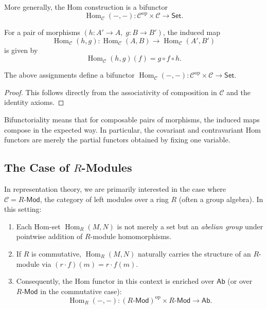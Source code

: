 More generally, the Hom construction is a bifunctor
\[
\operatorname{Hom}_{\mathcal{C}}(-, -): \mathcal{C}^{\mathrm{op}} \times \mathcal{C} \longrightarrow \mathsf{Set}.
\]

For a pair of morphisms $(h: A' \to A, \; g: B \to B')$, the induced map
\[
\operatorname{Hom}_{\mathcal{C}}(h, g): \operatorname{Hom}_{\mathcal{C}}(A, B) \longrightarrow \operatorname{Hom}_{\mathcal{C}}(A', B')
\]
is given by
\[
\operatorname{Hom}_{\mathcal{C}}(h, g)(f) = g \circ f \circ h.
\]

\begin{prop}
The above assignments define a bifunctor $\operatorname{Hom}_{\mathcal{C}}(-, -): \mathcal{C}^{\mathrm{op}} \times \mathcal{C} \to \mathsf{Set}$.
\end{prop}

\begin{proof}
This follows directly from the associativity of composition in $\mathcal{C}$ and the identity axioms.
\end{proof}

\begin{remark}
Bifunctoriality means that for composable pairs of morphisms, the induced maps compose in the expected way. In particular, the covariant and contravariant Hom functors are merely the partial functors obtained by fixing one variable.
\end{remark}

\subsection{The Case of $R$-Modules}

In representation theory, we are primarily interested in the case where $\mathcal{C} = R\text{-}\mathsf{Mod}$, the category of left modules over a ring $R$ (often a group algebra). In this setting:

\begin{enumerate}
    \item Each Hom-set $\operatorname{Hom}_R(M, N)$ is not merely a set but an \emph{abelian group} under pointwise addition of $R$-module homomorphisms.
    \item If $R$ is commutative, $\operatorname{Hom}_R(M, N)$ naturally carries the structure of an $R$-module via $(r \cdot f)(m) = r \cdot f(m)$.
    \item Consequently, the Hom functor in this context is enriched over $\mathsf{Ab}$ (or over $R\text{-}\mathsf{Mod}$ in the commutative case):
    \[
    \operatorname{Hom}_R(-, -): (R\text{-}\mathsf{Mod})^{\mathrm{op}} \times R\text{-}\mathsf{Mod} \longrightarrow \mathsf{Ab}.
    \]
\end{enumerate}

